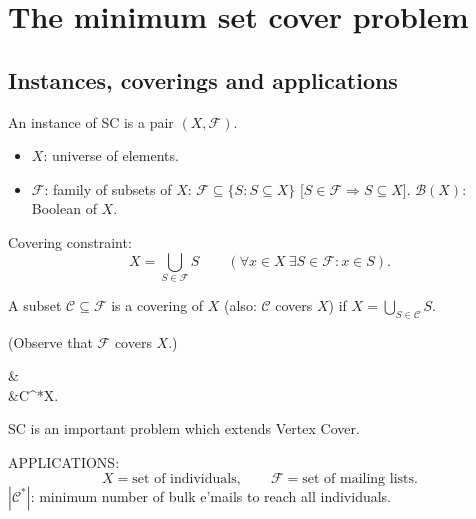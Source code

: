 \section{The minimum set cover problem}
\subsection{Instances, coverings and applications}
An instance of SC is a pair $(X,\mathcal F)$.
\begin{itemize}
\item $X$: universe of elements.
\item $\mathcal F$: family of subsets of $X$: $\mathcal F\subseteq\{S:S\subseteq X\}$ [$S\in\mathcal F\Rightarrow S\subseteq X$]. $\mathcal B(X)$: Boolean of $X$.
\end{itemize}
Covering constraint:
\[X=\bigcup_{S\in\mathcal F}S\qquad
(\forall x\in X\ \exists S\in\mathcal F:x\in S).\]
\begin{notesdefinition}
A subset $\mathcal C\subseteq\mathcal F$ is a covering of $X$ (also: $\mathcal C$ covers $X$) if
$X=\bigcup_{S\in\mathcal C}S$.

(Observe that $\mathcal F$ covers $X$.)
\end{notesdefinition}
\begin{notesproblem}
&\\
&\mathcal C^*X.
\end{notesproblem}
SC is an important problem which extends Vertex Cover.

APPLICATIONS:
\[X=\text{set of individuals},\qquad\mathcal F=\text{set of mailing lists}.\]
$|\mathcal C^*|$: minimum number of bulk e'mails to reach all individuals.
